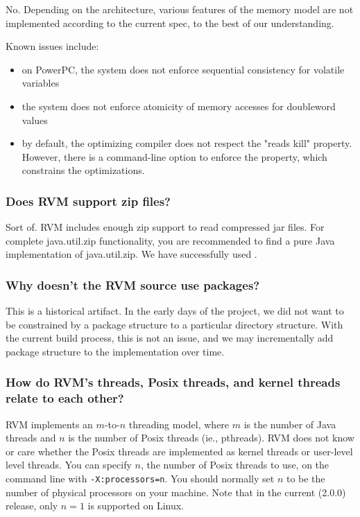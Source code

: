 No. Depending on the architecture, various features of the memory model
are not implemented according to the current spec, to the best of our
understanding.

Known issues include:
\begin{itemize}
\item on PowerPC, the system does not enforce sequential consistency for
volatile variables
\item the system does not enforce atomicity of memory accesses for
doubleword values
\item by default, the optimizing compiler does not respect the "reads
kill" property.  However, there is a command-line option to enforce the
property, which constrains the optimizations.
\end{itemize}


\subsubsection{Does RVM support zip files?}

Sort of.  RVM includes enough zip support to read compressed jar files.
For complete java.util.zip functionality, you are recommended to find 
a pure Java implementation of java.util.zip.  We have successfully used
. 

\subsubsection{Why doesn't the RVM source use packages?}

This is a historical artifact.  In the early days of the project, we did
not want to be constrained by a package structure to a particular
directory structure.  With the current build process, this is not an
issue, and we may incrementally add package structure to the
implementation over time.

\subsubsection{How do RVM's threads, Posix threads, and kernel
threads relate to each other?}

RVM implements an $m$-to-$n$ threading model, where $m$ is the number of 
Java threads and $n$ is the number of Posix threads (ie., pthreads).  RVM
does not know or care whether the Posix threads are implemented as kernel
threads or user-level level threads.  You can specify $n$, the number of
Posix threads to use, on the command line with {\tt -X:processors=n}.
You should normally set $n$ to be the number of physical processors on
your machine.  Note that in the current (2.0.0) release, only $n=1$ is
supported on Linux.

